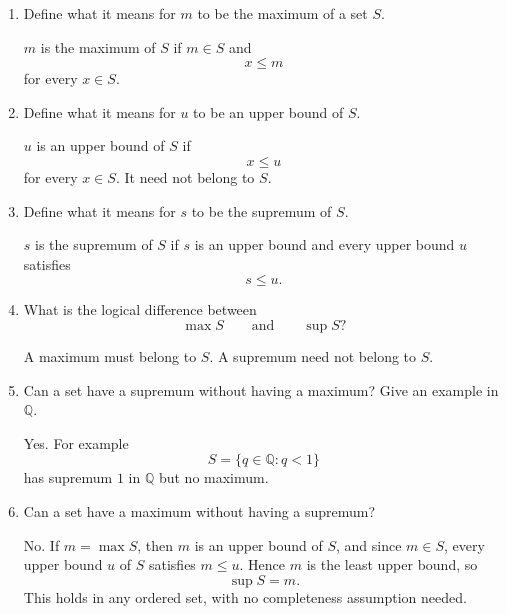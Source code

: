 \documentclass{essay}
\begin{document}
\begin{enumerate}[label=\arabic*., itemsep=10pt]

\item Define what it means for $m$ to be the maximum of a set $S$.

\begin{answer}
$m$ is the maximum of $S$ if $m\in S$ and
\[
x\le m
\]
for every $x\in S$.
\end{answer}

\item Define what it means for $u$ to be an upper bound of $S$.

\begin{answer}
$u$ is an upper bound of $S$ if
\[
x\le u
\]
for every $x\in S$. It need not belong to $S$.
\end{answer}

\item Define what it means for $s$ to be the supremum of $S$.

\begin{answer}
$s$ is the supremum of $S$ if $s$ is an upper bound and every upper bound $u$ satisfies
\[
s\le u.
\]
\end{answer}

\item What is the logical difference between
\[
\max S
\qquad\text{and}\qquad
\sup S?
\]

\begin{answer}
A maximum must belong to $S$. A supremum need not belong to $S$.
\end{answer}

\item Can a set have a supremum without having a maximum? Give an example in $\mathbb{Q}$.

\begin{answer}
Yes. For example
\[
S=\{q\in\mathbb{Q}:q<1\}
\]
has supremum $1$ in $\mathbb{Q}$ but no maximum.
\end{answer}

\item Can a set have a maximum without having a supremum?

\begin{answer}
No. If $m=\max S$, then $m$ is an upper bound of $S$, and since $m\in S$, every upper bound $u$ of $S$ satisfies $m\le u$. Hence $m$ is the least upper bound, so
\[
\sup S=m.
\]
This holds in any ordered set, with no completeness assumption needed.
\end{answer}


\end{enumerate}
\end{document}
